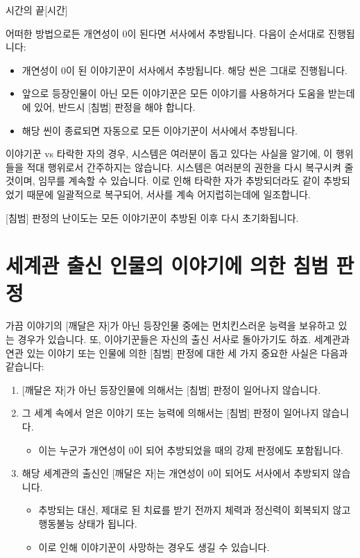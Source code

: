 \documentclass{report}
\begin{document}
	\begin{story}{시간의 끝}{[시간]}
	\end{story}
	
	어떠한 방법으로든 개연성이 0이 된다면 서사에서 추방됩니다. 다음이 순서대로 진행됩니다:
	\begin{itemize}
		\item 개연성이 0이 된 이야기꾼이 서사에서 추방됩니다. 해당 씬은 그대로 진행됩니다.
		\item 앞으로 등장인물이 아닌 모든 이야기꾼은 모든 이야기를 사용하거다 도움을 받는데에 있어, 반드시 [침범] 판정을 해야 합니다.
		\item 해당 씬이 종료되면 자동으로 모든 이야기꾼이 서사에서 추방됩니다.
	\end{itemize}
	이야기꾼 vs 타락한 자의 경우, 시스템은 여러분이 돕고 있다는 사실을 알기에, 이 행위들을 적대 행위로서 간주하지는 않습니다. 시스템은 여러분의 권한을 다시 복구시켜 줄 것이며, 임무를 계속할 수 있습니다. 이로 인해 타락한 자가 추방되더라도 같이 추방되었기 때문에 일괄적으로 복구되어, 서사를 계속 어지럽히는데에 일조합니다.
	
	[침범] 판정의 난이도는 모든 이야기꾼이 추방된 이후 다시 초기화됩니다.
	
	\section*{세계관 출신 인물의 이야기에 의한 침범 판정}
	가끔 이야기의 [깨달은 자]가 아닌 등장인물 중에는 먼치킨스러운 능력을 보유하고 있는 경우가 있습니다. 또, 이야기꾼들은 자신의 출신 서사로 돌아가기도 하죠. 세계관과 연관 있는 이야기 또는 인물에 의한 [침범] 판정에 대한 세 가지 중요한 사실은 다음과 같습니다:
	\begin{enumerate}
		\item {}[깨달은 자]가 아닌 등장인물에 의해서는 [침범] 판정이 일어나지 않습니다.
		\item 그 세계 속에서 얻은 이야기 또는 능력에 의해서는 [침범] 판정이 일어나지 않습니다.
		\begin{itemize}
			\item 이는 누군가 개연성이 0이 되어 추방되었을 때의 강제 판정에도 포함됩니다.
		\end{itemize}
		\item 해당 세계관의 출신인 [깨달은 자]는 개연성이 0이 되어도 서사에서 추방되지 않습니다.
		\begin{itemize}
			\item 추방되는 대신, 제대로 된 치료를 받기 전까지 체력과 정신력이 회복되지 않고 행동불능 상태가 됩니다.
			\item 이로 인해 이야기꾼이 사망하는 경우도 생길 수 있습니다.
		\end{itemize}
	\end{enumerate}
	
\end{document}
